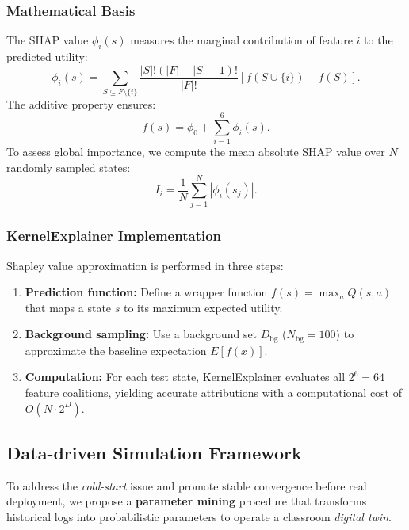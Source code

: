 \documentclass[9pt, conference, a4paper, compsocconf]{IEEEtran}
\begin{document}
\subsubsection{Mathematical Basis}
The SHAP value $\phi_i(s)$ measures the marginal contribution of feature $i$ to the predicted utility:
\begin{equation}
\phi_i(s) = \sum_{S \subseteq F \setminus \{i\}} 
\frac{|S|!(|F|-|S|-1)!}{|F|!}
\left[f(S \cup \{i\}) - f(S)\right].
\end{equation}
The additive property ensures:
\begin{equation}
f(s) = \phi_0 + \sum_{i=1}^{6} \phi_i(s).
\end{equation}
To assess global importance, we compute the mean absolute SHAP value over $N$ randomly sampled states:
\begin{equation}
I_i = \frac{1}{N}\sum_{j=1}^{N}|\phi_i(s_j)|.
\end{equation}

\subsubsection{KernelExplainer Implementation}
Shapley value approximation is performed in three steps:
\begin{enumerate}
    \item \textbf{Prediction function:} Define a wrapper function $f(s) = \max_{a} Q(s,a)$ that maps a state $s$ to its maximum expected utility.
    \item \textbf{Background sampling:} Use a background set $D_{\text{bg}}$ ($N_{\text{bg}}=100$) to approximate the baseline expectation $E[f(x)]$.
    \item \textbf{Computation:} For each test state, KernelExplainer evaluates all $2^6=64$ feature coalitions, yielding accurate attributions with a computational cost of $O(N \cdot 2^D)$.
\end{enumerate}

\subsection{Data-driven Simulation Framework}
To address the \textit{cold-start} issue and promote stable convergence before real deployment, we propose a \textbf{parameter mining} procedure that transforms historical logs into probabilistic parameters to operate a classroom \textit{digital twin}.
\end{document}
